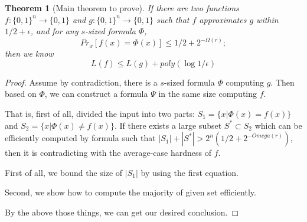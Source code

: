 \documentclass[12pt]{article}
\newtheorem{theorem}{Theorem}[section]
\renewcommand{\.}{,\ldots,}
\begin{document}
\begin{theorem}[Main theorem to prove]
	If there are two functions $f:\{0,1\}^n\rightarrow \{0,1\}$ and $g:\{0,1\}^{ n}\rightarrow \{0,1\}$ such that $f$ approximates $g$ within $1/2+\epsilon$, and for any $s$-sized formula $\Phi$, $$Pr_x[f(x)=\Phi(x)]\leq 1/2+2^{-\Omega (r)};$$
	then  we know
	$$L(f)\leq L(g)+poly(\log 1/\epsilon)$$
 
\end{theorem}
\begin{proof}
Assume by contradiction, there is a $s$-sized formula $\Phi$ computing $g$. Then based on $\Phi$, we can construct a formula $\Psi$ in the same size computing $f$. 

That is, first of all, divided the input into two parts: $S_1=\{x|\Phi(x)=f(x)\}$ and 
$S_2=\{x|\Phi(x)\neq f(x)\}$. If there exists a large subset $S^*\subset S_2$ which can be efficiently computed by formula such that $|S_1|+|S^*|> 2^n(1/2+2^{-Omega(r)})$, then it is contradicting with the average-case hardness of $f$. 

First of all, we bound the size of $|S_1|$ by using the first equation. 

Second, we show how to compute the majority of given set efficiently. 

By the above those things, we can get our desired conclusion. 
\end{proof}


\end{document}

